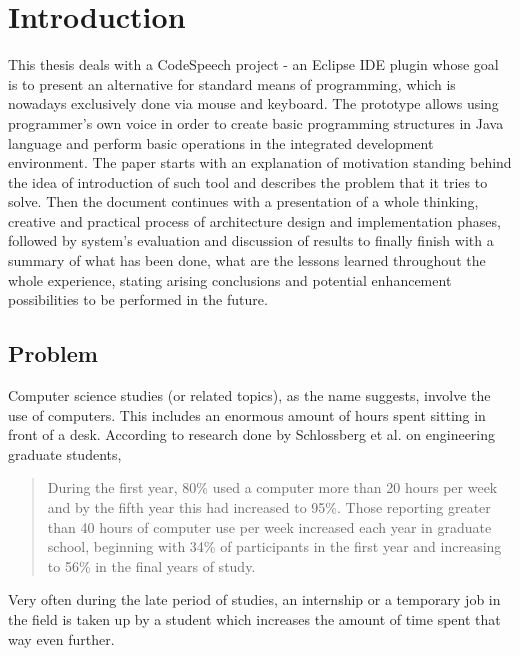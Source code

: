 \chapter{Introduction}
\label{cha:Introduction}


This thesis deals with a CodeSpeech project - an Eclipse IDE plugin whose goal is to present an alternative for standard means of programming, which is nowadays exclusively done via mouse and keyboard. The prototype allows using programmer's own voice in order to create basic programming structures in Java language and perform basic operations in the integrated development environment. The paper starts with an explanation of motivation standing behind the idea of introduction of such tool and describes the problem that it tries to solve. Then the document continues with a presentation of a whole thinking, creative and practical process of architecture design and implementation phases, followed by system's evaluation and discussion of results to finally finish with a summary of what has been done, what are the lessons learned throughout the whole experience, stating arising conclusions and potential enhancement possibilities to be performed in the future.

\section{Problem}
Computer science studies (or related topics), as the name suggests, involve the use of computers. This includes an enormous amount of hours spent sitting in front of a desk. According to research done by Schlossberg et al. on engineering graduate students,
\begin{quote}\begin{english}
    During the first year, 80\%
    used a computer more than 20 hours per week and by the fifth year this had increased to
    95\%. Those reporting greater than 40 hours of computer use per week increased each
    year in graduate school, beginning with 34\% of participants in the first year and
    increasing to 56\% in the final years of study. \cite{Schlossberg2004} 
 \end{english}\end{quote}
Very often during the late period of studies, an internship or a temporary job in the field is taken up by a student which increases the amount of time spent that way even further. 

